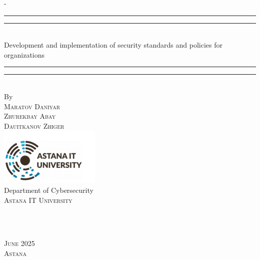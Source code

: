 %
%
\begin{titlingpage}
\begin{SingleSpace}
\calccentering{\unitlength} 
\begin{adjustwidth*}{\unitlength}{-\unitlength}
\begin{center}
\rule[0.5ex]{\linewidth}{2pt}\vspace*{-\baselineskip}\vspace*{3.2pt}
\rule[0.5ex]{\linewidth}{1pt}\\[\baselineskip]
{
\linespread{2.0} \selectfont
%
{\HUGE Development and implementation of security standards and policies for organizations }\\[4mm]
}

%
\rule[0.5ex]{\linewidth}{1pt}\vspace*{-\baselineskip}\vspace{3.2pt}
\rule[0.5ex]{\linewidth}{2pt}\\
\vspace{5.5mm}
{\large By}\\
\vspace{6.5mm}
{\large\textsc{Maratov Daniyar}}\\
{\large\textsc{Zhurekbay Abay}}\\
{\large\textsc{Dauitkanov Zhiger}}\\
\vspace{11mm}
\includegraphics[scale=1.2]{logos/AITU.png}\\
\vspace{6mm}
{\large Department of Cybersecurity\\
\textsc{Astana IT University}}\\
\vspace{30mm}
\begin{minipage}{10cm}
 \\
\end{minipage}\\
\vspace{40mm}
{\large\textsc{June 2025}}\\
{\large\textsc{Astana}}
\vspace{12mm}
\end{center}
\end{adjustwidth*}
\end{SingleSpace}
\end{titlingpage}